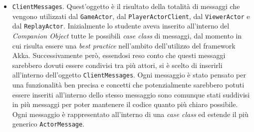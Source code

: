      \begin{itemize}
     \item \texttt{ClientMessages}.
     Quest'oggetto è il risultato della totalità di messaggi che vengono utilizzati dal \texttt{GameActor}, dal \texttt{PlayerActorClient}, dal \texttt{ViewerActor} e dal \texttt{ReplayActor}. Inizialmente lo studente aveva inserito all'interno del \textit{Companion Object} tutte le possibili \textit{case class} di messaggi, dal momento in cui risulta essere una \textit{best practice} nell'ambito dell'utilizzo del framework Akka. Successivamente però, essendosi reso conto che questi messaggi sarebbero dovuti essere condivisi tra più attori, si è scelto di inserirli all'interno dell'oggetto \texttt{ClientMessages}. Ogni messaggio è stato pensato per una funzionalità ben precisa e concetti che potenzialmente sarebbero potuti essere inseriti all'interno dello stesso messaggio sono comunque stati suddivisi in più messaggi per poter mantenere il codice quanto più chiaro possibile. Ogni messaggio è rappresentato all'interno di una \textit{case class} ed estende il più generico \texttt{ActorMessage}.


\end{itemize}
